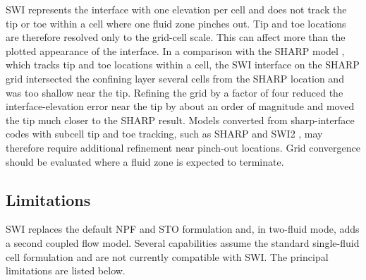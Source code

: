 SWI represents the interface with one elevation per cell and does not track the tip or toe within a cell where one fluid zone pinches out. Tip and toe locations are therefore resolved only to the grid-cell scale. This can affect more than the plotted appearance of the interface. In a comparison with the SHARP model \citep{essaid1990}, which tracks tip and toe locations within a cell, the SWI interface on the SHARP grid intersected the confining layer several cells from the SHARP location and was too shallow near the tip. Refining the grid by a factor of four reduced the interface-elevation error near the tip by about an order of magnitude and moved the tip much closer to the SHARP result. Models converted from sharp-interface codes with subcell tip and toe tracking, such as SHARP and SWI2 \citep{bakker2013documentation}, may therefore require additional refinement near pinch-out locations. Grid convergence should be evaluated where a fluid zone is expected to terminate.

\subsection{Limitations}
\label{sec:swi-limitations}

SWI replaces the default NPF and STO formulation and, in two-fluid mode, adds a second coupled flow model. Several \mf capabilities assume the standard single-fluid cell formulation and are not currently compatible with SWI. The principal limitations are listed below.

